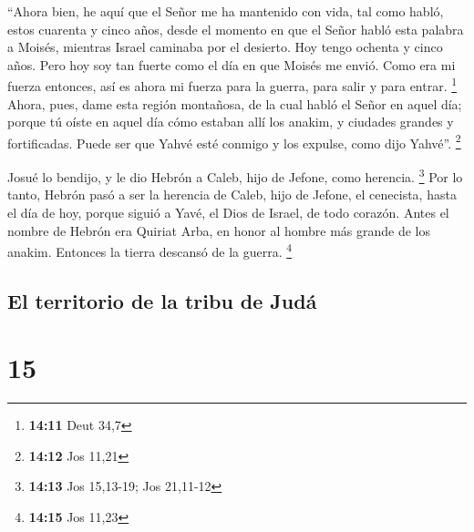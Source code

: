  ``Ahora bien, he aquí que el Señor me ha mantenido con
vida, tal como habló, estos cuarenta y cinco años, desde el momento en
que el Señor habló esta palabra a Moisés, mientras Israel caminaba por
el desierto. Hoy tengo ochenta y cinco años.  Pero hoy
soy tan fuerte como el día en que Moisés me envió. Como era mi fuerza
entonces, así es ahora mi fuerza para la guerra, para salir y para
entrar. \footnote{\textbf{14:11} Deut 34,7}  Ahora, pues,
dame esta región montañosa, de la cual habló el Señor en aquel día;
porque tú oíste en aquel día cómo estaban allí los anakim, y ciudades
grandes y fortificadas. Puede ser que Yahvé esté conmigo y los expulse,
como dijo Yahvé''. \footnote{\textbf{14:12} Jos 11,21}

 Josué lo bendijo, y le dio Hebrón a Caleb, hijo de
Jefone, como herencia. \footnote{\textbf{14:13} Jos 15,13-19; Jos
  21,11-12}  Por lo tanto, Hebrón pasó a ser la herencia
de Caleb, hijo de Jefone, el cenecista, hasta el día de hoy, porque
siguió a Yavé, el Dios de Israel, de todo corazón.  Antes
el nombre de Hebrón era Quiriat Arba, en honor al hombre más grande de
los anakim. Entonces la tierra descansó de la guerra. \footnote{\textbf{14:15}
  Jos 11,23}

\hypertarget{el-territorio-de-la-tribu-de-juduxe1}{%
\subsection{El territorio de la tribu de
Judá}\label{el-territorio-de-la-tribu-de-juduxe1}}

\hypertarget{section-14}{%
\section{15}\label{section-14}}

